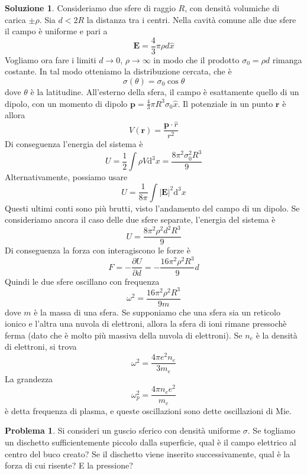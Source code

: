 \documentclass[a4paper,11pt]{book}
\newcommand{\dif}{\mathrm{d}}
\renewcommand{\vec}[1]{\mathbf{#1}}
\theoremstyle{theorem}
\theoremstyle{definition}
\newtheorem{problema}{Problema}[section]
\newtheorem{soluzione}{Soluzione}[section]
\begin{document}
\begin{soluzione}
	Consideriamo due sfere di raggio $R$, con densità volumiche di carica $\pm\rho$. Sia $d<2R$ la distanza tra i centri. Nella cavità comune alle due sfere il campo è uniforme e pari a
	\[\vec{E}=\frac{4}{3}\pi\rho d\hat{x}\]
	Vogliamo ora fare i limiti $d\to0$, $\rho\to\infty$ in modo che il prodotto $\sigma_0=\rho d$ rimanga costante. In tal modo otteniamo la distribuzione cercata, che è
	\[\sigma(\theta)=\sigma_0\cos\theta\]
	dove $\theta$ è la latitudine. All'esterno della sfera, il campo è esattamente quello di un dipolo, con un momento di dipolo $\vec{p}=\frac{4}{3}\pi R^3\sigma_0\hat{x}$. Il potenziale in un punto $\vec{r}$ è allora
	\[V(\vec{r})=\frac{\vec{p}\cdot\hat{r}}{r^2}\]
	Di conseguenza l'energia del sistema è
	\[U=\frac{1}{2}\int\rho V\dif^3x=\frac{8\pi^2\sigma_0^2 R^3}{9}\]
	Alternativamente, possiamo usare
	\[U=\frac{1}{8\pi}\int|\vec{E}|^2\dif^3x\]
	Questi ultimi conti sono più brutti, visto l'andamento del campo di un dipolo.
	Se consideriamo ancora il caso delle due sfere separate, l'energia del sistema è
	\[U=\frac{8\pi^2\rho^2d^2R^3}{9}\]
	Di conseguenza la forza con interagiscono le forze è
	\[F=-\frac{\partial U}{\partial d}=-\frac{16\pi^2\rho^2R^3}{9}d\]
	Quindi le due sfere oscillano con frequenza
	\[\omega^2=\frac{16\pi^2\rho^2R^3}{9m}\]
	dove $m$ è la massa di una sfera. Se supponiamo che una sfera sia un reticolo ionico e l'altra una nuvola di elettroni, allora la sfera di ioni rimane pressochè ferma (dato che è molto più massiva della nuvola di elettroni). Se $n_e$ è la densità di elettroni, si trova
	\[\omega^2=\frac{4\pi e^2n_e}{3m_e}\]
	La grandezza
	\[\omega_p^2=\frac{4\pi n_ee^2}{m_e}\]
	è detta frequenza di plasma, e queste oscillazioni sono dette oscillazioni di Mie.
\end{soluzione}
\begin{problema}
	Si consideri un guscio sferico con densità uniforme $\sigma$. Se togliamo un dischetto sufficientemente piccolo dalla superficie, qual è il campo elettrico al centro del buco creato? Se il dischetto viene inserito successivamente, qual è la forza di cui risente? E la pressione?
\end{problema}
\end{document}
